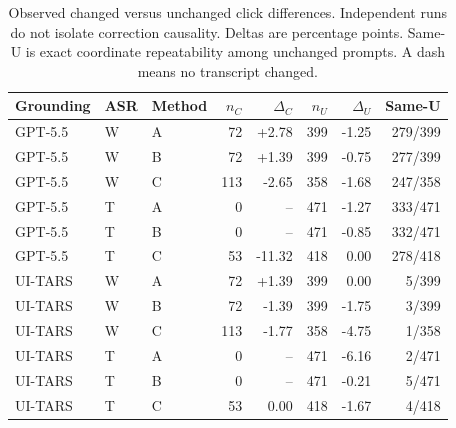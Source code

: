\begin{table}[t]
\centering
\caption{Observed changed versus unchanged click differences. Independent runs do not isolate correction causality. Deltas are percentage points. Same-U is exact coordinate repeatability among unchanged prompts. A dash means no transcript changed.}
\label{tab:changed-unchanged}
\small
\begin{tabular}{lllrrrrr}
\toprule
Grounding & ASR & Method & $n_C$ & $\Delta_C$ & $n_U$ & $\Delta_U$ & Same-U \\
\midrule
GPT-5.5 & W & A & 72 & +2.78 & 399 & -1.25 & 279/399 \\
GPT-5.5 & W & B & 72 & +1.39 & 399 & -0.75 & 277/399 \\
GPT-5.5 & W & C & 113 & -2.65 & 358 & -1.68 & 247/358 \\
GPT-5.5 & T & A & 0 & -- & 471 & -1.27 & 333/471 \\
GPT-5.5 & T & B & 0 & -- & 471 & -0.85 & 332/471 \\
GPT-5.5 & T & C & 53 & -11.32 & 418 & 0.00 & 278/418 \\
UI-TARS & W & A & 72 & +1.39 & 399 & 0.00 & 5/399 \\
UI-TARS & W & B & 72 & -1.39 & 399 & -1.75 & 3/399 \\
UI-TARS & W & C & 113 & -1.77 & 358 & -4.75 & 1/358 \\
UI-TARS & T & A & 0 & -- & 471 & -6.16 & 2/471 \\
UI-TARS & T & B & 0 & -- & 471 & -0.21 & 5/471 \\
UI-TARS & T & C & 53 & 0.00 & 418 & -1.67 & 4/418 \\
\bottomrule
\end{tabular}
\end{table}

